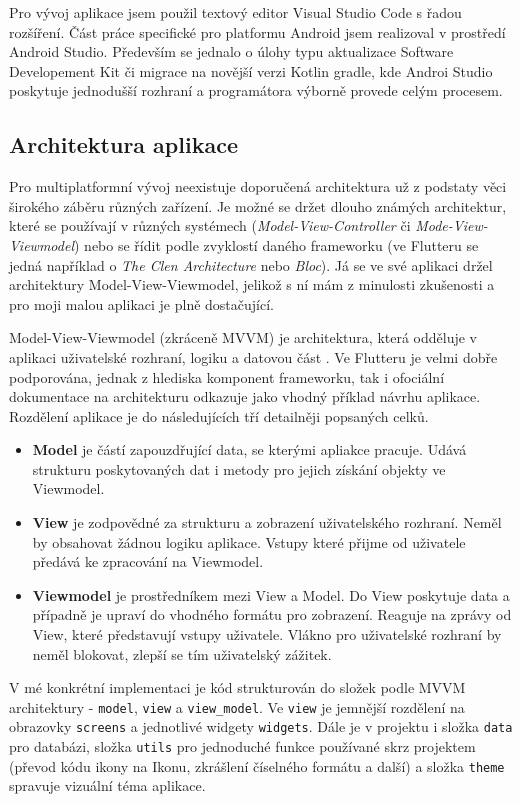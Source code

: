 \documentclass[
  biblatex,
  figures=true,
  tables=false,
  glossaries,
  index
]{kidiplom}
\begin{document}
Pro vývoj aplikace jsem použil textový editor Visual Studio Code s řadou rozšíření. Část práce specifické pro platformu Android jsem realizoval v prostředí Android Studio. Především se jednalo o úlohy typu aktualizace Software Developement Kit či migrace na novější verzi Kotlin gradle, kde Androi Studio poskytuje jednodušší rozhraní a programátora výborně provede celým procesem.

\subsection{Architektura aplikace}
Pro multiplatformní vývoj neexistuje doporučená architektura už z podstaty věci širokého záběru různých zařízení. Je možné se držet dlouho známých architektur, které se používají v různých systémech (\textit{Model-View-Controller} či \textit{Mode-View-Viewmodel}) nebo se řídit podle zvyklostí daného frameworku (ve Flutteru se jedná například o \textit{The Clen Architecture} nebo \textit{Bloc}). Já se ve své aplikaci držel architektury Model-View-Viewmodel, jelikož s ní mám z minulosti zkušenosti a pro moji malou aplikaci je plně dostačující. 

Model-View-Viewmodel (zkráceně MVVM) je architektura, která odděluje v aplikaci uživatelské rozhraní, logiku a datovou část \cite{mvvm}. Ve Flutteru je velmi dobře podporována, jednak z hlediska komponent frameworku, tak i ofociální dokumentace na architekturu odkazuje jako vhodný příklad návrhu aplikace. Rozdělení aplikace je do následujících tří detailněji popsaných celků.
\begin{itemize}
  \item \textbf{Model} je částí zapouzdřující data, se kterými apliakce pracuje. Udává strukturu poskytovaných dat i metody pro jejich získání objekty ve Viewmodel.
  \item \textbf{View} je zodpovědné za strukturu a zobrazení uživatelského rozhraní. Neměl by obsahovat žádnou logiku aplikace. Vstupy které přijme od uživatele předává ke zpracování na Viewmodel. 
  \item \textbf{Viewmodel} je prostředníkem mezi View a Model. Do View poskytuje data a případně je upraví do vhodného formátu pro zobrazení. Reaguje na zprávy od View, které představují vstupy uživatele. Vlákno pro uživatelské rozhraní by neměl blokovat, zlepší se tím uživatelský zážitek.
\end{itemize}

V mé konkrétní implementaci je kód strukturován do složek podle MVVM architektury - \verb|model|, \verb|view| a \verb|view_model|. Ve \verb|view| je jemnější rozdělení na obrazovky \verb|screens| a jednotlivé widgety \verb|widgets|. Dále je v projektu i složka \verb|data| pro databázi, složka \verb|utils| pro jednoduché funkce používané skrz projektem (převod kódu ikony na Ikonu, zkrášlení číselného formátu a další) a složka \verb|theme| spravuje vizuální téma aplikace.
\end{document}
